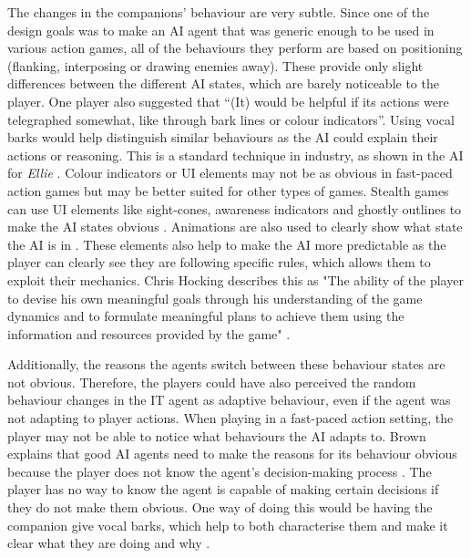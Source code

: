 \documentclass{IEEEtran}
\begin{document}
The changes in the companions’ behaviour are very subtle. Since one of the design goals was to make an AI agent that was generic enough to be used in various action games, all of the behaviours they perform are based on positioning (flanking, interposing or drawing enemies away). These provide only slight differences between the different AI states, which are barely noticeable to the player. One player also suggested that “(It) would be helpful if its actions were telegraphed somewhat, like through bark lines or colour indicators”. Using vocal barks would help distinguish similar behaviours as the AI could explain their actions or reasoning. This is a standard technique in industry, as shown in the AI for \textit{Ellie} \cite{GAIP2EllieAI}. Colour indicators or UI elements may not be as obvious in fast-paced action games but may be better suited for other types of games. Stealth games can use UI elements like sight-cones, awareness indicators and ghostly outlines to make the AI states obvious \cite{GMTStealthSenses1, GMTStealthDetection3}. Animations are also used to clearly show what state the AI is in \cite{GMTStealthDetection3}. These elements also help to make the AI more predictable as the player can clearly see they are following specific rules, which allows them to exploit their mechanics. Chris Hocking describes this as "The ability of the player to devise his own meaningful goals through his understanding of the game dynamics and to formulate meaningful plans to achieve them using the information and resources provided by the game" \cite{GDCIntentioalPlay}.

Additionally, the reasons the agents switch between these behaviour states are not obvious. Therefore, the players could have also perceived the random behaviour changes in the IT agent as adaptive behaviour, even if the agent was not adapting to player actions. When playing in a fast-paced action setting, the player may not be able to notice what behaviours the AI adapts to. Brown explains that good AI agents need to make the reasons for its behaviour obvious because the player does not know the agent's decision-making process \cite{GMTGoodAI}. The player has no way to know the agent is capable of making certain decisions if they do not make them obvious. One way of doing this would be having the companion give vocal barks, which help to both characterise them and make it clear what they are doing and why \cite{GAIP2EllieAI}.
\end{document}

